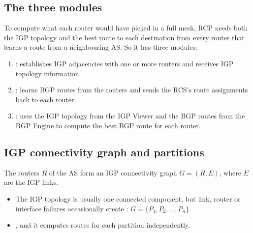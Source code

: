 \subsection{The three modules}
To compute what each router would have picked in a full mesh, RCP needs both the IGP topology and the best route to each destination from every router that learns a route from a neighbouring AS. So it has three modules:
\begin{enumerate}
\item {}: establishes IGP adjacencies with one or more routers and receives IGP topology information.
\item {}: learns BGP routes from the routers and sends the RCS's route assignments back to each router.
\item {}: uses the IGP topology from the IGP Viewer and the BGP routes from the BGP Engine to compute the best BGP route for each router.
\end{enumerate}

\subsection{IGP connectivity graph and partitions}
The routers $R$ of the AS form an IGP connectivity graph $G=(R,E)$, where $E$ are the IGP links.
\begin{itemize}
\item The IGP topology is usually one connected component, but link, router or interface failures occasionally create : $G=\{P_1,P_2,\ldots,P_n\}$.
\item {}, and it computes routes for each partition independently.
\end{itemize}

